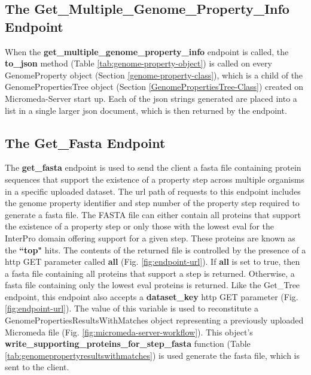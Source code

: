 \subsection{The Get\_Multiple\_Genome\_Property\_Info Endpoint}

When the \textbf{get\_multiple\_genome\_property\_info} endpoint is called, the 
\textbf{to\_json} method (Table \ref{tab:genome-property-object}) is called on 
every GenomeProperty object (Section \ref{genome-property-class}), which is a 
child of the GenomePropertiesTree object (Section 
\ref{GenomePropertiesTree-Class}) created on Micromeda-Server start up. Each of 
the \gls{json} strings generated are placed into a list in a single larger 
\gls{json} document, which is then returned by the endpoint. 

\subsection{The Get\_Fasta Endpoint} \label{get-fasta-endpoint}

The \textbf{get\_fasta} endpoint is used to send the client a \gls{fasta} file 
containing protein sequences that support the existence of a property step 
across multiple organisms in a specific uploaded dataset. The \gls{url} path of 
requests to this endpoint includes the genome property identifier and step 
number of the property step required to generate a \gls{fasta} file. The FASTA file 
can either contain all proteins that support the existence of a property step or 
only those with the lowest \gls{eval} for the InterPro domain offering support 
for a given step. These proteins are known as the \textbf{``top"} hits. The 
contents of the returned file is controlled by the presence of a \gls{http} GET 
parameter called \textbf{all} (Fig. \ref{fig:endpoint-url}). If \textbf{all} is 
set to true, then a \gls{fasta} file containing all proteins that support a step is 
returned. Otherwise, a \gls{fasta} file containing only the lowest \gls{eval} proteins 
is returned. Like the Get\_Tree endpoint, this endpoint also accepts a 
\textbf{dataset\_key} \gls{http} GET parameter (Fig. \ref{fig:endpoint-url}). 
The value of this variable is used to reconstitute a 
GenomePropertiesResultsWithMatches object representing a previously uploaded 
Micromeda file (Fig. \ref{fig:micromeda-server-workflow}). This object's 
\textbf{write\_supporting\_proteins\_for\_step\_fasta} function (Table 
\ref{tab:genomepropertyresultswithmatches}) is used generate the \gls{fasta} file, 
which is sent to the client.

